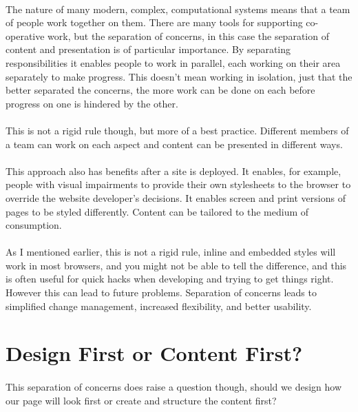 \paragraph{} The nature of many modern, complex, computational systems means that a team of people work together on them. There are many tools for supporting co-operative work, but the separation of concerns, in this case the separation of content and presentation is of particular importance. By separating responsibilities it enables people to work in parallel, each working on their area separately to make progress. This doesn't mean working in isolation, just that the better separated the concerns, the more work can be done on each before progress on one is hindered by the other.
\paragraph{} This is not a rigid rule though, but more of a best practice. Different members of a team can work on each aspect and content can be presented in different ways. 
\paragraph{} This approach also has benefits after a site is deployed. It enables, for example, people with visual impairments to provide their own stylesheets to the browser to override the website developer’s decisions. It enables screen and print versions of pages to be styled differently. Content can be tailored to the medium of consumption.
\paragraph{} As I mentioned earlier, this is not a rigid rule, inline and embedded styles will work in most browsers, and you might not be able to tell the difference, and this is often useful for quick hacks when developing and trying to get things right. However this can lead to future problems. Separation of concerns leads to simplified change management, increased flexibility, and better usability.


\section{Design First or Content First?}
\paragraph{} This separation of concerns does raise a question though, should we design how our page will look first or create and structure the content first?
